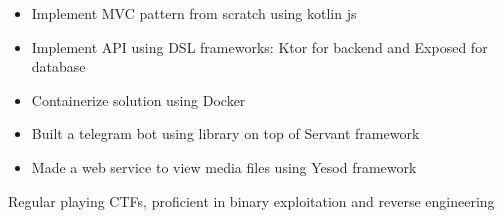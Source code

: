 \documentclass[10pt,a4paper,ragged2e,withhyper]{altacv}
\begin{document}
\begin{paracol}{2}
\divider

\begin{itemize}
\item Implement MVC pattern from scratch using kotlin js
\item Implement API using DSL frameworks: Ktor for backend and Exposed for database
\item Containerize solution using Docker
\end{itemize}

\divider

\begin{itemize}
\item Built a telegram bot using library on top of Servant framework
\item Made a web service to view media files using Yesod framework
\end{itemize}

\medskip

Regular playing CTFs, proficient in binary exploitation and reverse engineering









\end{paracol}
\end{document}
